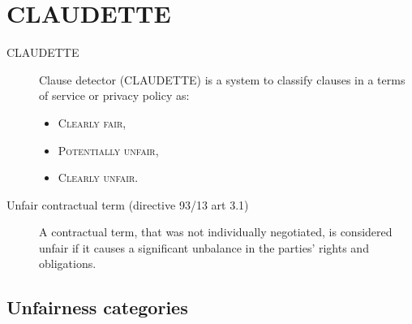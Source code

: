 \chapter{CLAUDETTE}

\begin{description}
    \item[CLAUDETTE] 
        Clause detector (CLAUDETTE) is a system to classify clauses in a terms of service or privacy policy as:
        \begin{itemize}
            \item \textsc{Clearly fair},
            \item \textsc{Potentially unfair},
            \item \textsc{Clearly unfair}.
        \end{itemize}

    \item[Unfair contractual term (directive 93/13 art 3.1)] 
        A contractual term, that was not individually negotiated, is considered unfair if it causes a significant unbalance in the parties' rights and obligations.
\end{description}


\section{Unfairness categories}

